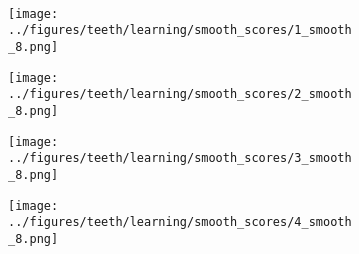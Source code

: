 \begin{figure}[h!]
	\vspace{-0.35cm}
	\\
	\begin{subfigure}{0.16\textwidth}
		\centering
		\texttt{[image: ../figures/teeth/learning/smooth\_scores/1\_smooth\_8.png]}
		\label{fig:1}
	\end{subfigure}
	\begin{subfigure}{0.16\textwidth}
		\centering
		\texttt{[image: ../figures/teeth/learning/smooth\_scores/2\_smooth\_8.png]}
		\label{fig:1}
	\end{subfigure}
	\begin{subfigure}{0.16\textwidth}
		\centering
		\texttt{[image: ../figures/teeth/learning/smooth\_scores/3\_smooth\_8.png]}
		\label{fig:1}
	\end{subfigure}
	\begin{subfigure}{0.16\textwidth}
		\centering
		\texttt{[image: ../figures/teeth/learning/smooth\_scores/4\_smooth\_8.png]}
		\label{fig:1}
	\end{subfigure}
	\begin{subfigure}{0.16\textwidth}

\end{subfigure}
\end{figure}
